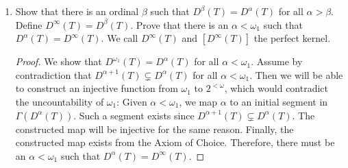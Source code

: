 \documentclass{article}
\begin{document}
\begin{enumerate}[label={\bf Q\arabic*:}]
\begin{enumerate}[label={(\roman*)}]
        \begin{proof}
          We prove by transfinite induction on $\alpha$ that $D^\alpha(T)$
          is a tree. The base case $D^0(T)=T$ is a tree by definition.
          At the inductive step for successor ordinals $\alpha+1$, let
          $\sigma\in D^{\alpha+1}(T)$ and $\tau\preceq\sigma$. Then
          $\sigma$ is contained in $D^\alpha(T)$ which is a tree by
          inductive hypothesis, and thus $\tau$ is also contained in
          $D^\alpha(T)$. Also, $\sigma$ is not contained in
          $\Gamma(D^\alpha(T))$, which means there are inifinite paths that
          pass through $\sigma$. This implies that there are infinite paths
          that pass through $\tau$, so $\tau$ is also not contained in
          $\Gamma(D^\alpha(T))$. Hence $\tau$ is contained in
          $D^{\alpha+1}(T)$, which implies that $D^{\alpha+1}(T)$ is closed
          under initial initial segments and is therefore a tree. For the
          inductive step where $\alpha$ is a limit ordinal, $D^\alpha(T)$
          is the intersection of trees by the induction hypothesis.
          Therefore if $\sigma\in D^\alpha(T)$ and $\tau\preceq\sigma$,
          then $\tau$ must be contained in those trees whose intersection
          is $D^\alpha(T)$, so $\tau$ is also contaiend in $D^\alpha(T)$.
          Thus $D^\alpha(T)$ is closed under initial segments, making it a 
          tree. \\

          Clearly $D^\alpha(T)\subseteq T$ by definition. Then since
          $D^\alpha(T)$ is a tree, $[T]$ is well-defined. Hence
          $[D^\alpha(T)]\subseteq[T]$.
        \end{proof}

      \item Show that there is an ordinal $\beta$ such that
        $D^\beta(T)=D^\alpha(T)$ for all $\alpha>\beta$. Define
        $D^\infty(T)=D^\beta(T)$. Prove that there is an $\alpha<\omega_1$
        such that $D^\alpha(T)=D^\infty(T)$. We call $D^\infty(T)$ and
        $[D^\infty(T)]$ the perfect kernel.

        \begin{proof}
          We show that $D^{\omega_1}(T)=D^\alpha(T)$ for all
          $\alpha<\omega_1$. Assume by contradiction that
          $D^{\alpha+1}(T)\subsetneq D^\alpha(T)$ for all
          $\alpha<\omega_1$. Then we will be able to construct an injective
          function from $\omega_1$ to $2^{<\omega}$, which would contradict
          the uncountability of $\omega_1$: Given $\alpha<\omega_1$, we map
          $\alpha$ to an initial segment in $\Gamma(D^\alpha(T))$. Such a
          segment exists since $D^{\alpha+1}(T)\subsetneq D^\alpha(T)$.
          The constructed map will be injective for the same reason.
          Finally, the constructed map exists from the Axiom of Choice.
          Therefore, there must be an $\alpha<\omega_1$ such that
          $D^\alpha(T)=D^\infty(T)$.
        \end{proof}


\end{enumerate}
\end{enumerate}
\end{document}
